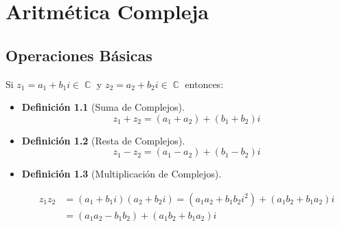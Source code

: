 \documentclass[12pt, fleqn]{report}                             %
\newtheorem{Definition}{Definición}[section]                    %
\newenvironment{MultiLineEquation}[1]                           %
        {\begin{equation}\begin{alignedat}{#1}}                     %
        {\end{alignedat}\end{equation}}                             %
\DeclareMathOperator \Complexs  {\mathbb{C}}                     %
\begin{document}
    \chapter{Aritmética Compleja}

        \clearpage
        \section{Operaciones Básicas}
            Si $z_1 = a_1 + b_1i \in \Complexs$ y $z_2 = a_2 + b_2i \in \Complexs$ entonces:

            \begin{itemize}

                \item
                    \begin{Definition}[Suma de Complejos]
                    \label{SumaComplejos}
                        \begin{equation}
                            z_1 + z_2 = (a_1+a_2) + (b_1+b_2)i
                        \end{equation}
                    \end{Definition}

                \item
                    \begin{Definition}[Resta de Complejos]
                    \label{RestaComplejos}
                        \begin{equation}
                            z_1 - z_2 = (a_1-a_2) + (b_1-b_2)i
                        \end{equation}
                    \end{Definition}

                \item 
                    \begin{Definition}[Multiplicación de Complejos]
                    \label{MultiplicacionComplejos}

                        \begin{MultiLineEquation}{1}
                            z_1 z_2 &= (a_1+b_1i)(a_2+b_2i) 
                                     = (a_1a_2 + b_1b_2i^2) + (a_1b_2 + b_1a_2)i  \\
                                    &= (a_1a_2 - b_1b_2)   + (a_1b_2 + b_1a_2)i
                        \end{MultiLineEquation}


\end{Definition}
\end{itemize}
\end{document}
